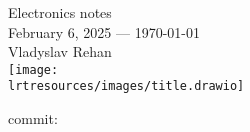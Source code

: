 
\begin{titlepage}
	\vspace*{\fill}
	\begin{center}
		\Huge
		Electronics notes\\
		\vspace{1cm}
		\Large
		February 6, 2025 --- \today\\
		\large
		Vladyslav Rehan\\
		\vspace*{4cm}
		\texttt{[image: \\lrtresources/images/title.drawio]}
		\vspace*{5cm}
	\end{center}
	\vspace*{\fill}
	\begin{raggedleft}
		\footnotesize commit: \href{\elnthomepage}{\texttt{\elntcommithash}}
	\end{raggedleft}
\end{titlepage}